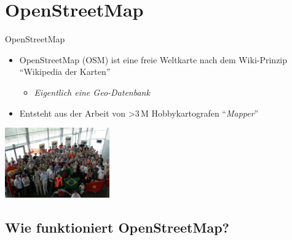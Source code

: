 \documentclass{beamer}
\begin{document}
\section{OpenStreetMap}
\begin{frame}{OpenStreetMap}

\begin{itemize}
  \item OpenStreetMap (OSM) ist eine freie Weltkarte nach dem Wiki-Prinzip "`Wikipedia der Karten"'
    \begin{itemize}
      \item \emph{Eigentlich eine Geo-Datenbank}
    \end{itemize}

          \pause
            \item Entsteht aus der Arbeit von \textgreater 3\,M Hobbykartografen "`\emph{Mapper}"'
          \end{itemize}

           \begin{center}
              \includegraphics[width=4.5cm]{sotm.jpg}
               \end{center}

\end{frame}


\subsection{Wie funktioniert OpenStreetMap?}
\end{document}
